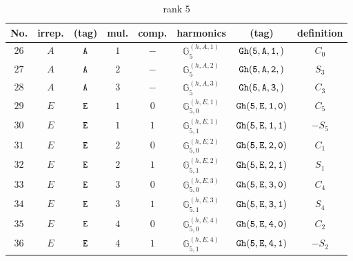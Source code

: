 \documentclass[fleqn,8pt]{jsarticle}
\begin{document}
\begin{table}[ht!]
\begin{center}
\caption{rank 5}
\renewcommand{\arraystretch}{1.3}
\begin{tabular}{cccccccc} \hline \hline
No. & irrep. & (tag) & mul. & comp. & harmonics & (tag) & definition \\ \hline
$ 26 $ & $ A $ & $ {\tt A} $ & $ 1 $ & $ - $ & $ \mathbb{G}_{5}^{(h,A,1)} $ & $ {\tt Gh(5,A,1,)} $ & $ C_{0} $ \\
$ 27 $ & $ A $ & $ {\tt A} $ & $ 2 $ & $ - $ & $ \mathbb{G}_{5}^{(h,A,2)} $ & $ {\tt Gh(5,A,2,)} $ & $ S_{3} $ \\
$ 28 $ & $ A $ & $ {\tt A} $ & $ 3 $ & $ - $ & $ \mathbb{G}_{5}^{(h,A,3)} $ & $ {\tt Gh(5,A,3,)} $ & $ C_{3} $ \\
$ 29 $ & $ E $ & $ {\tt E} $ & $ 1 $ & $ 0 $ & $ \mathbb{G}_{5,0}^{(h,E,1)} $ & $ {\tt Gh(5,E,1,0)} $ & $ C_{5} $ \\
$ 30 $ & $ E $ & $ {\tt E} $ & $ 1 $ & $ 1 $ & $ \mathbb{G}_{5,1}^{(h,E,1)} $ & $ {\tt Gh(5,E,1,1)} $ & $ - S_{5} $ \\
$ 31 $ & $ E $ & $ {\tt E} $ & $ 2 $ & $ 0 $ & $ \mathbb{G}_{5,0}^{(h,E,2)} $ & $ {\tt Gh(5,E,2,0)} $ & $ C_{1} $ \\
$ 32 $ & $ E $ & $ {\tt E} $ & $ 2 $ & $ 1 $ & $ \mathbb{G}_{5,1}^{(h,E,2)} $ & $ {\tt Gh(5,E,2,1)} $ & $ S_{1} $ \\
$ 33 $ & $ E $ & $ {\tt E} $ & $ 3 $ & $ 0 $ & $ \mathbb{G}_{5,0}^{(h,E,3)} $ & $ {\tt Gh(5,E,3,0)} $ & $ C_{4} $ \\
$ 34 $ & $ E $ & $ {\tt E} $ & $ 3 $ & $ 1 $ & $ \mathbb{G}_{5,1}^{(h,E,3)} $ & $ {\tt Gh(5,E,3,1)} $ & $ S_{4} $ \\
$ 35 $ & $ E $ & $ {\tt E} $ & $ 4 $ & $ 0 $ & $ \mathbb{G}_{5,0}^{(h,E,4)} $ & $ {\tt Gh(5,E,4,0)} $ & $ C_{2} $ \\
$ 36 $ & $ E $ & $ {\tt E} $ & $ 4 $ & $ 1 $ & $ \mathbb{G}_{5,1}^{(h,E,4)} $ & $ {\tt Gh(5,E,4,1)} $ & $ - S_{2} $ \\
 \hline \hline
\end{tabular}
\end{center}
\end{table}
\end{document}
